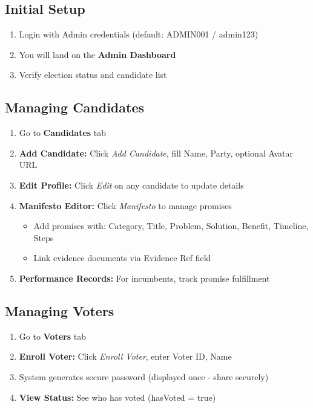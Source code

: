 \subsection{Initial Setup}
\begin{enumerate}
    \item Login with Admin credentials (default: ADMIN001 / admin123)
    \item You will land on the \textbf{Admin Dashboard}
    \item Verify election status and candidate list
\end{enumerate}

\subsection{Managing Candidates}
\begin{enumerate}
    \item Go to \textbf{Candidates} tab
    \item \textbf{Add Candidate:} Click \textit{Add Candidate}, fill Name, Party, optional Avatar URL
    \item \textbf{Edit Profile:} Click \textit{Edit} on any candidate to update details
    \item \textbf{Manifesto Editor:} Click \textit{Manifesto} to manage promises
    \begin{itemize}
        \item Add promises with: Category, Title, Problem, Solution, Benefit, Timeline, Steps
        \item Link evidence documents via Evidence Ref field
    \end{itemize}
    \item \textbf{Performance Records:} For incumbents, track promise fulfillment
\end{enumerate}

\subsection{Managing Voters}
\begin{enumerate}
    \item Go to \textbf{Voters} tab
    \item \textbf{Enroll Voter:} Click \textit{Enroll Voter}, enter Voter ID, Name
    \item System generates secure password (displayed once - share securely)
    \item \textbf{View Status:} See who has voted (hasVoted = true)
\end{enumerate}

